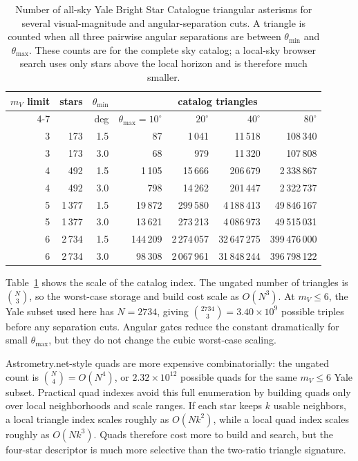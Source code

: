 \documentclass[11pt]{article}
\begin{document}
\begin{table}[h]
\centering
\small
\begin{tabular}{rrrrrrr}
\toprule
\(m_V\) limit & stars & \(\theta_{\min}\) & \multicolumn{4}{c}{catalog triangles} \\
\cmidrule(lr){4-7}
 & & deg & \(\theta_{\max}=10^\circ\) & \(20^\circ\) & \(40^\circ\) & \(80^\circ\) \\
\midrule
3 & 173  & 1.5 & 87      & 1\,041    & 11\,518     & 108\,340 \\
3 & 173  & 3.0 & 68      & 979       & 11\,320     & 107\,808 \\
4 & 492  & 1.5 & 1\,105  & 15\,666   & 206\,679    & 2\,338\,867 \\
4 & 492  & 3.0 & 798     & 14\,262   & 201\,447    & 2\,322\,737 \\
5 & 1\,377 & 1.5 & 19\,872 & 299\,580  & 4\,188\,413 & 49\,846\,167 \\
5 & 1\,377 & 3.0 & 13\,621 & 273\,213  & 4\,086\,973 & 49\,515\,031 \\
6 & 2\,734 & 1.5 & 144\,209 & 2\,274\,057 & 32\,647\,275 & 399\,476\,000 \\
6 & 2\,734 & 3.0 & 98\,308  & 2\,067\,961 & 31\,848\,244 & 396\,798\,122 \\
\bottomrule
\end{tabular}
\caption{Number of all-sky Yale Bright Star Catalogue triangular asterisms for
several visual-magnitude and angular-separation cuts. A triangle is counted
when all three pairwise angular separations are between \(\theta_{\min}\) and
\(\theta_{\max}\). These counts are for the complete sky catalog; a local-sky
browser search uses only stars above the local horizon and is therefore much
smaller.}
\label{tab:yale-triangle-counts}
\end{table}

Table~\ref{tab:yale-triangle-counts} shows the scale of the catalog index. The
ungated number of triangles is \(\binom{N}{3}\), so the worst-case storage and
build cost scale as \(O(N^3)\). At \(m_V\le 6\), the Yale subset used here has
\(N=2734\), giving \(\binom{2734}{3}=3.40\times10^9\) possible triples before
any separation cuts. Angular gates reduce the constant dramatically for small
\(\theta_{\max}\), but they do not change the cubic worst-case scaling.

Astrometry.net-style quads are more expensive combinatorially: the ungated
count is \(\binom{N}{4}=O(N^4)\), or \(2.32\times10^{12}\) possible quads for
the same \(m_V\le6\) Yale subset. Practical quad indexes avoid this full
enumeration by building quads only over local neighborhoods and scale ranges.
If each star keeps \(k\) usable neighbors, a local triangle index scales roughly
as \(O(Nk^2)\), while a local quad index scales roughly as \(O(Nk^3)\). Quads
therefore cost more to build and search, but the four-star descriptor is much
more selective than the two-ratio triangle signature.
\end{document}
